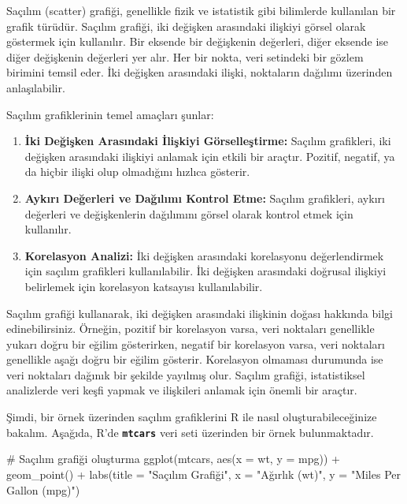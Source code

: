 \documentclass[
  letterpaper,
  DIV=11,
  numbers=noendperiod]{scrreprt}
\newenvironment{Shaded}{\begin{snugshade}}{\end{snugshade}}
\newcommand{\AttributeTok}[1]{\textcolor[rgb]{0.40,0.45,0.13}{#1}}
\newcommand{\CommentTok}[1]{\textcolor[rgb]{0.37,0.37,0.37}{#1}}
\newcommand{\FunctionTok}[1]{\textcolor[rgb]{0.28,0.35,0.67}{#1}}
\newcommand{\NormalTok}[1]{\textcolor[rgb]{0.00,0.23,0.31}{#1}}
\newcommand{\SpecialCharTok}[1]{\textcolor[rgb]{0.37,0.37,0.37}{#1}}
\newcommand{\StringTok}[1]{\textcolor[rgb]{0.13,0.47,0.30}{#1}}
\begin{document}

Saçılım (scatter) grafiği, genellikle fizik ve istatistik gibi
bilimlerde kullanılan bir grafik türüdür. Saçılım grafiği, iki değişken
arasındaki ilişkiyi görsel olarak göstermek için kullanılır. Bir eksende
bir değişkenin değerleri, diğer eksende ise diğer değişkenin değerleri
yer alır. Her bir nokta, veri setindeki bir gözlem birimini temsil eder.
İki değişken arasındaki ilişki, noktaların dağılımı üzerinden
anlaşılabilir.

Saçılım grafiklerinin temel amaçları şunlar:

\begin{enumerate}
\def\labelenumi{\arabic{enumi}.}
\item
  \textbf{İki Değişken Arasındaki İlişkiyi Görselleştirme:} Saçılım
  grafikleri, iki değişken arasındaki ilişkiyi anlamak için etkili bir
  araçtır. Pozitif, negatif, ya da hiçbir ilişki olup olmadığını hızlıca
  gösterir.
\item
  \textbf{Aykırı Değerleri ve Dağılımı Kontrol Etme:} Saçılım
  grafikleri, aykırı değerleri ve değişkenlerin dağılımını görsel olarak
  kontrol etmek için kullanılır.
\item
  \textbf{Korelasyon Analizi:} İki değişken arasındaki korelasyonu
  değerlendirmek için saçılım grafikleri kullanılabilir. İki değişken
  arasındaki doğrusal ilişkiyi belirlemek için korelasyon katsayısı
  kullanılabilir.
\end{enumerate}

Saçılım grafiği kullanarak, iki değişken arasındaki ilişkinin doğası
hakkında bilgi edinebilirsiniz. Örneğin, pozitif bir korelasyon varsa,
veri noktaları genellikle yukarı doğru bir eğilim gösterirken, negatif
bir korelasyon varsa, veri noktaları genellikle aşağı doğru bir eğilim
gösterir. Korelasyon olmaması durumunda ise veri noktaları dağınık bir
şekilde yayılmış olur. Saçılım grafiği, istatistiksel analizlerde veri
keşfi yapmak ve ilişkileri anlamak için önemli bir araçtır.

Şimdi, bir örnek üzerinden saçılım grafiklerini R ile nasıl
oluşturabileceğinize bakalım. Aşağıda, R'de \textbf{\texttt{mtcars}}
veri seti üzerinden bir örnek bulunmaktadır.

\begin{Shaded}
\begin{Highlighting}[]
\CommentTok{\# Saçılım grafiği oluşturma}
\FunctionTok{ggplot}\NormalTok{(mtcars, }\FunctionTok{aes}\NormalTok{(}\AttributeTok{x =}\NormalTok{ wt, }\AttributeTok{y =}\NormalTok{ mpg)) }\SpecialCharTok{+}
  \FunctionTok{geom\_point}\NormalTok{() }\SpecialCharTok{+}
  \FunctionTok{labs}\NormalTok{(}\AttributeTok{title =} \StringTok{"Saçılım Grafiği"}\NormalTok{,}
       \AttributeTok{x =} \StringTok{"Ağırlık (wt)"}\NormalTok{,}
       \AttributeTok{y =} \StringTok{"Miles Per Gallon (mpg)"}\NormalTok{)}
\end{Highlighting}
\end{Shaded}
\end{document}
